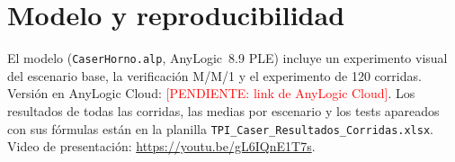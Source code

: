 \documentclass[a4paper,11pt]{article}
\newcommand{\pendiente}[1]{\textcolor{red}{[PENDIENTE: #1]}}
\begin{document}
\section*{Modelo y reproducibilidad}

El modelo (\texttt{CaserHorno.alp}, AnyLogic~8.9 PLE) incluye un experimento visual del escenario base, la
verificación M/M/1 y el experimento de 120 corridas. Versión en AnyLogic Cloud: \pendiente{link de AnyLogic Cloud}.
Los resultados de todas las corridas, las medias por escenario y los tests apareados con sus fórmulas están en
la planilla \texttt{TPI\_Caser\_Resultados\_Corridas.xlsx}. Video de presentación: \url{https://youtu.be/gL6IQnE1T7s}.



\end{document}
